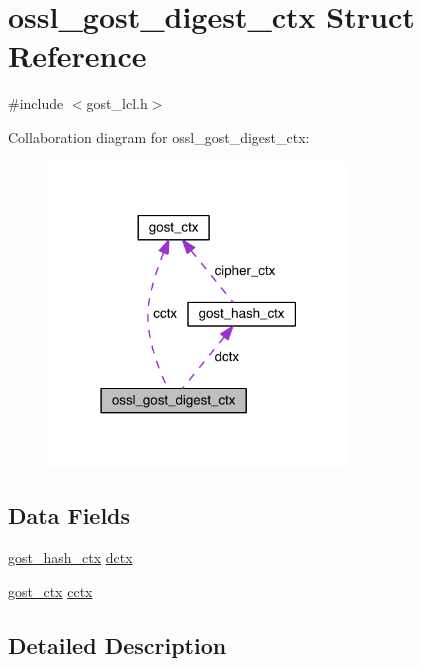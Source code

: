 \hypertarget{structossl__gost__digest__ctx}{}\section{ossl\+\_\+gost\+\_\+digest\+\_\+ctx Struct Reference}
\label{structossl__gost__digest__ctx}


{\ttfamily \#include $<$gost\+\_\+lcl.\+h$>$}



Collaboration diagram for ossl\+\_\+gost\+\_\+digest\+\_\+ctx\+:\nopagebreak
\begin{figure}[H]
\begin{center}
\leavevmode
\includegraphics[width=226pt]{structossl__gost__digest__ctx__coll__graph}
\end{center}
\end{figure}
\subsection*{Data Fields}
\begin{DoxyCompactItemize}
\item 
\hyperlink{structgost__hash__ctx}{gost\+\_\+hash\+\_\+ctx} \hyperlink{structossl__gost__digest__ctx_ad00dbdfd4b54c6c19ef82eae98a5b5ed}{dctx}
\item 
\hyperlink{structgost__ctx}{gost\+\_\+ctx} \hyperlink{structossl__gost__digest__ctx_a4536f57bd141b77644121499b784cabf}{cctx}
\end{DoxyCompactItemize}


\subsection{Detailed Description}


